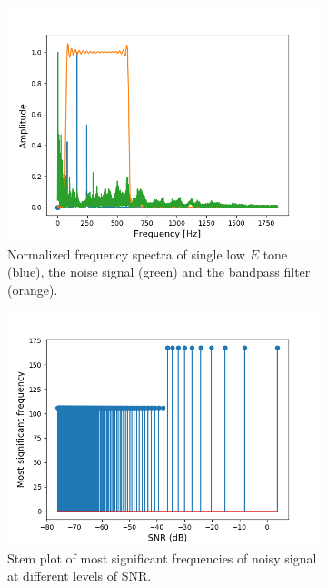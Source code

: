 \begin{figure}[H]
\begin{subfigure}{0.49\textwidth}
\centering
\includegraphics[width=\textwidth]{figures/SNR/single_spectrum.png}
\caption{Normalized frequency spectra of single low $E$ tone (blue), the noise signal (green) and the bandpass filter (orange).}
\label{fig:single_spectrum}
\end{subfigure}
\begin{subfigure}{0.49\textwidth}
\centering
\includegraphics[width=\textwidth]{figures/SNR/single_stem.png}
\caption{Stem plot of most significant frequencies of noisy signal at different levels of SNR.}
\label{fig:single_stem}
\end{subfigure}
\caption{}
\label{fig:single_noise}
\end{figure}

